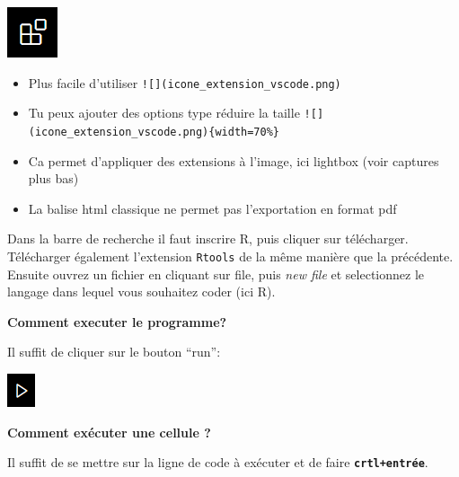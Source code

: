 \documentclass[
  letterpaper,
  DIV=11,
  numbers=noendperiod]{scrartcl}
\providecommand{\tightlist}{%
  \setlength{\itemsep}{0pt}\setlength{\parskip}{0pt}}\usepackage{longtable,booktabs,array}
\begin{document}
\includegraphics{img/icone_extension_vscode.png}

\begin{tcolorbox}[enhanced jigsaw, colframe=quarto-callout-note-color-frame, toprule=.15mm, titlerule=0mm, opacityback=0, bottomtitle=1mm, bottomrule=.15mm, rightrule=.15mm, title=\textcolor{quarto-callout-note-color}{\faInfo}\hspace{0.5em}{Pour Coralie (insertion d'image)}, leftrule=.75mm, colbacktitle=quarto-callout-note-color!10!white, toptitle=1mm, arc=.35mm, colback=white, opacitybacktitle=0.6, breakable, left=2mm, coltitle=black]

\begin{itemize}
\tightlist
\item
  Plus facile d'utiliser \texttt{!{[}{]}(icone\_extension\_vscode.png)}
\item
  Tu peux ajouter des options type réduire la taille
  \texttt{!{[}{]}(icone\_extension\_vscode.png)\{width=70\%\}}
\item
  Ca permet d'appliquer des extensions à l'image, ici lightbox (voir
  captures plus bas)
\item
  La balise html classique ne permet pas l'exportation en format pdf
\end{itemize}

\end{tcolorbox}

Dans la barre de recherche il faut inscrire R, puis cliquer sur
télécharger. Télécharger également l'extension \texttt{Rtools} de la
même manière que la précédente. Ensuite ouvrez un fichier en cliquant
sur file, puis \emph{new file} et selectionnez le langage dans lequel
vous souhaitez coder (ici R).

\textbf{Comment executer le programme?}

Il suffit de cliquer sur le bouton ``run'':

\includegraphics{img/run_r_vscode.png}

\textbf{Comment exécuter une cellule ?}

Il suffit de se mettre sur la ligne de code à exécuter et de faire
\textbf{\texttt{crtl+entrée}}.
\end{document}
